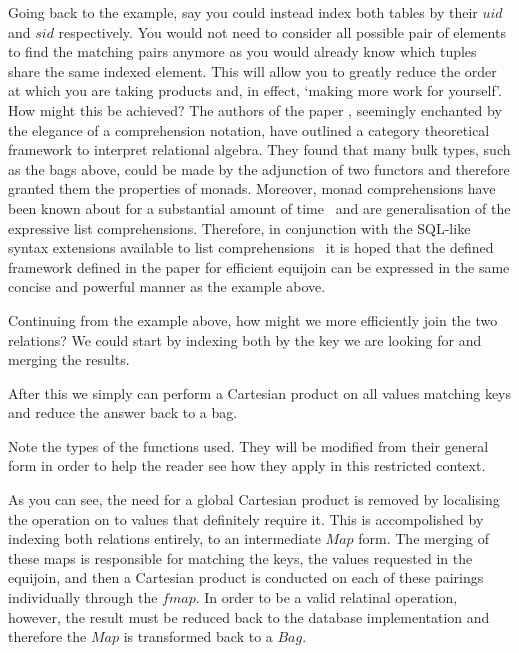Going back to the example, say you could instead index both tables by their
$uid$ and $sid$ respectively. You would not need to consider all possible pair
of elements to find the matching pairs anymore as you would already know which
tuples share the same indexed element. This will allow you to greatly reduce the
order at which you are taking products and, in effect, `making more work for
yourself'. How might this be achieved? The authors of the paper \relalg{},
seemingly enchanted by the elegance of a comprehension notation, have outlined a
category theoretical framework to interpret relational algebra. They found that
many bulk types, such as the bags above, could be made by the adjunction of two
functors and therefore granted them the properties of monads. Moreover, monad
comprehensions have been known about for a substantial amount of
time~\cite{MonadComprehensions} and are generalisation of the expressive list
comprehensions. Therefore, in conjunction with the SQL-like syntax extensions
available to list comprehensions~\cite{ComprehensiveComprehensions} it is hoped
that the defined framework defined in the paper for efficient equijoin can be
expressed in the same concise and powerful manner as the example above.

Continuing from the example above, how might we more efficiently join the
two relations? We could start by indexing both by the key we are looking for and
merging the results.

\begin{center}

\end{center}

\noindent
After this we simply can perform a Cartesian product on all values matching keys
and reduce the answer back to a bag.

\begin{center}

\end{center}

\noindent
Note the types of the functions used. They will be modified from their general
form in order to help the reader see how they apply in this restricted context.



\noindent
As you can see, the need for a global Cartesian product is removed by localising
the operation on to values that definitely require it. This is accompolished by
indexing both relations entirely, to an intermediate $Map$ form. The merging of
these maps is responsible for matching the keys, the values requested in the
equijoin, and then a Cartesian product is conducted on each of these pairings
individually through the $fmap$. In order to be a valid relatinal operation,
however, the result must be reduced back to the database implementation and
therefore the $Map$ is transformed back to a $Bag$.


